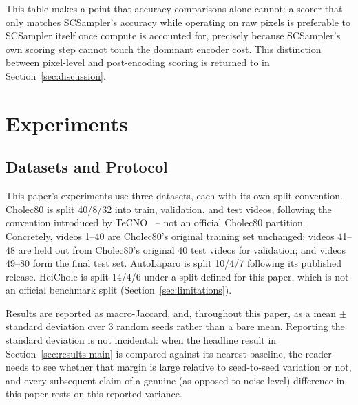 \documentclass[preprint,12pt]{elsarticle}
\begin{document}
This table makes a point that accuracy comparisons alone cannot: a scorer that only matches SCSampler's accuracy while operating on raw pixels is preferable to SCSampler itself once compute is accounted for, precisely because SCSampler's own scoring step cannot touch the dominant encoder cost. This distinction between pixel-level and post-encoding scoring is returned to in Section~\ref{sec:discussion}.

\section{Experiments}
\label{sec:results}

\subsection{Datasets and Protocol}
\label{sec:results-protocol}

This paper's experiments use three datasets, each with its own split convention. Cholec80 is split 40/8/32 into train, validation, and test videos, following the convention introduced by TeCNO~\cite{czempiel2020tecno} -- not an official Cholec80 partition. Concretely, videos 1--40 are Cholec80's original training set unchanged; videos 41--48 are held out from Cholec80's original 40 test videos for validation; and videos 49--80 form the final test set. AutoLaparo is split 10/4/7 following its published release. HeiChole is split 14/4/6 under a split defined for this paper, which is not an official benchmark split (Section~\ref{sec:limitations}).

Results are reported as macro-Jaccard, and, throughout this paper, as a mean $\pm$ standard deviation over 3 random seeds rather than a bare mean. Reporting the standard deviation is not incidental: when the headline result in Section~\ref{sec:results-main} is compared against its nearest baseline, the reader needs to see whether that margin is large relative to seed-to-seed variation or not, and every subsequent claim of a genuine (as opposed to noise-level) difference in this paper rests on this reported variance.
\end{document}
